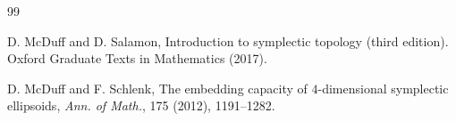 \documentclass[12pt]{amsart}
\theoremstyle{definition}
\begin{document}
\begin{thebibliography} {99}












 D. McDuff and D. Salamon, Introduction to symplectic topology (third edition). Oxford Graduate Texts in Mathematics (2017).


 D. McDuff and F. Schlenk, The embedding capacity of $4$-dimensional symplectic ellipsoids, {\it Ann. of Math.}, 175 (2012), 1191--1282.




\end{thebibliography}
\end{document}
